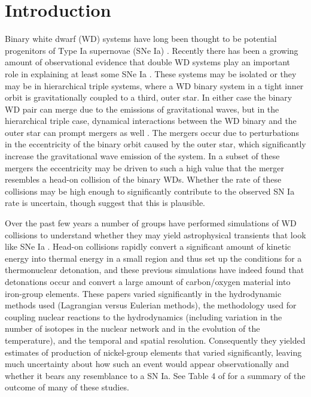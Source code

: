 \documentclass[twocolumn,numberedappendix]{../aastex6}
\begin{document}
\section{Introduction}
\label{sec:introduction}

Binary white dwarf (WD) systems have long been thought to be potential progenitors
of Type Ia supernovae (SNe Ia) \citep{ibentutukov:1984,webbink:1984}. Recently there
has been a growing amount of observational evidence that double WD systems play
an important role in explaining at least some SNe Ia \citep{maoz:2014}. These systems
may be isolated or they may be in hierarchical triple systems, where a WD binary
system in a tight inner orbit is gravitationally coupled to a third, outer star.
In either case the binary WD pair can merge due to the emissions of gravitational waves,
but in the hierarchical triple case, dynamical interactions between the WD binary and
the outer star can prompt mergers as well \citep{thompson:2011,hamers:2013}. The mergers
occur due to perturbations in the eccentricity of the binary orbit caused by the outer
star, which significantly increase the gravitational wave emission of the system. In a
subset of these mergers the eccentricity may be driven to such a high value that the
merger resembles a head-on collision of the binary WDs. Whether the rate of these collisions
may be high enough to significantly contribute to the observed SN Ia rate is uncertain,
though \cite{katzdong:2012} suggest that this is plausible.

Over the past few years a number of groups have performed simulations of WD collisions
to understand whether they may yield astrophysical transients that look like SNe Ia
\citep{rosswog:2009,raskin:2010,loren-aguilar:2010,hawley:2012,garcia-senz:2013,
kushnir:2013,papish:2015,holcomb:2015}. Head-on collisions rapidly convert a significant
amount of kinetic energy into thermal energy in a small region and thus set up the
conditions for a thermonuclear detonation, and these previous simulations have indeed
found that detonations occur and convert a large amount of carbon/oxygen material into
iron-group elements. These papers varied significantly in the hydrodynamic methods used
(Lagrangian versus Eulerian methods), the methodology used for coupling nuclear
reactions to the hydrodynamics (including variation in the number of isotopes in
the nuclear network and in the evolution of the temperature), and the temporal and
spatial resolution. Consequently they yielded estimates of production of nickel-group
elements that varied significantly, leaving much uncertainty about how such an event
would appear observationally and whether it bears any resemblance to a SN Ia.
See Table 4 of \cite{garcia-senz:2013} for a summary of the outcome of many of these studies.
\end{document}
